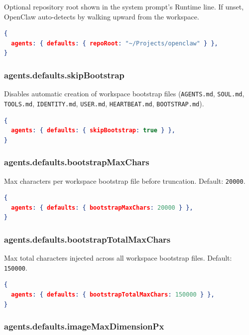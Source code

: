Optional repository root shown in the system prompt's Runtime line. If unset, OpenClaw auto-detects by walking upward from the workspace.

\begin{lstlisting}[language=json]
{
  agents: { defaults: { repoRoot: "~/Projects/openclaw" } },
}
\end{lstlisting}


\subsubsection{agents.defaults.skipBootstrap}


Disables automatic creation of workspace bootstrap files (\texttt{AGENTS.md}, \texttt{SOUL.md}, \texttt{TOOLS.md}, \texttt{IDENTITY.md}, \texttt{USER.md}, \texttt{HEARTBEAT.md}, \texttt{BOOTSTRAP.md}).

\begin{lstlisting}[language=json]
{
  agents: { defaults: { skipBootstrap: true } },
}
\end{lstlisting}


\subsubsection{agents.defaults.bootstrapMaxChars}


Max characters per workspace bootstrap file before truncation. Default: \texttt{20000}.

\begin{lstlisting}[language=json]
{
  agents: { defaults: { bootstrapMaxChars: 20000 } },
}
\end{lstlisting}


\subsubsection{agents.defaults.bootstrapTotalMaxChars}


Max total characters injected across all workspace bootstrap files. Default: \texttt{150000}.

\begin{lstlisting}[language=json]
{
  agents: { defaults: { bootstrapTotalMaxChars: 150000 } },
}
\end{lstlisting}


\subsubsection{agents.defaults.imageMaxDimensionPx}



